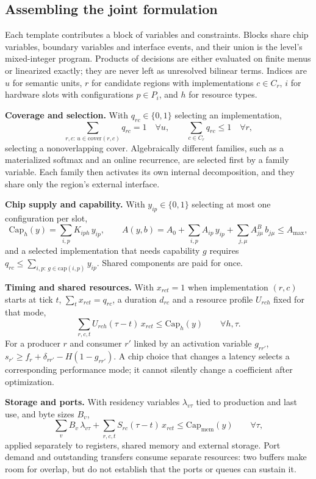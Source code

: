 \documentclass[11pt]{article}
\begin{document}
\hypertarget{assembling-the-joint-formulation}{%
\subsection{Assembling the joint formulation}\label{assembling-the-joint-formulation}}

Each template contributes a block of variables and constraints. Blocks share chip variables, boundary variables and interface events, and their union is the level's mixed-integer program. Products of decisions are either evaluated on finite menus or linearized exactly; they are never left as unresolved bilinear terms. Indices are \(u\) for semantic units, \(r\) for candidate regions with implementations \(c\in C_r\), \(i\) for hardware slots with configurations \(p\in P_i\), and \(h\) for resource types.

\textbf{Coverage and selection.} With \(q_{rc}\in\{0,1\}\) selecting an implementation,
\[
\sum_{r,c:\,u\in\mathrm{cover}(r,c)}q_{rc}=1\quad\forall u,\qquad\sum_{c\in C_r}q_{rc}\le1\quad\forall r,
\]
selecting a nonoverlapping cover. Algebraically different families, such as a materialized softmax and an online recurrence, are selected first by a family variable. Each family then activates its own internal decomposition, and they share only the region's external interface.

\textbf{Chip supply and capability.} With \(y_{ip}\in\{0,1\}\) selecting at most one configuration per slot,
\[
\mathrm{Cap}_h(y)=\sum_{i,p}K_{iph}\,y_{ip},\qquad A(y,b)=A_0+\sum_{i,p}A_{ip}\,y_{ip}+\sum_{j,\mu}A^{B}_{j\mu}\,b_{j\mu}\le A_{\max},
\]
and a selected implementation that needs capability \(g\) requires \(q_{rc}\le\sum_{i,p:\,g\in\mathrm{cap}(i,p)}y_{ip}\). Shared components are paid for once.

\textbf{Timing and shared resources.} With \(x_{rct}=1\) when implementation \((r,c)\) starts at tick \(t\), \(\sum_t x_{rct}=q_{rc}\), a duration \(d_{rc}\) and a resource profile \(U_{rch}\) fixed for that mode,
\[
\sum_{r,c,t}U_{rch}(\tau-t)\,x_{rct}\le\mathrm{Cap}_h(y)\qquad\forall h,\tau.
\]
For a producer \(r\) and consumer \(r'\) linked by an activation variable \(g_{rr'}\), \(s_{r'}\ge f_r+\delta_{rr'}-H(1-g_{rr'})\). A chip choice that changes a latency selects a corresponding performance mode; it cannot silently change a coefficient after optimization.

\textbf{Storage and ports.} With residency variables \(\lambda_{v\tau}\) tied to production and last use, and byte sizes \(B_v\),
\[
\sum_v B_v\,\lambda_{v\tau}+\sum_{r,c,t}S_{rc}(\tau-t)\,x_{rct}\le\mathrm{Cap}_{\mathrm{mem}}(y)\qquad\forall\tau,
\]
applied separately to registers, shared memory and external storage. Port demand and outstanding transfers consume separate resources: two buffers make room for overlap, but do not establish that the ports or queues can sustain it.
\end{document}
